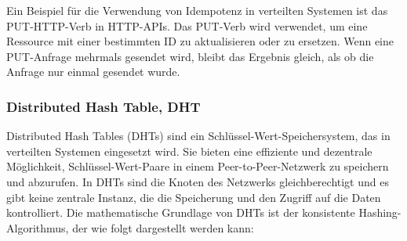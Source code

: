 \documentclass[../vs-script-first-v01.tex]{subfiles}
\begin{document}
Ein Beispiel für die Verwendung von Idempotenz in verteilten Systemen ist das PUT-HTTP-Verb in HTTP-APIs. Das PUT-Verb wird verwendet, um eine Ressource mit einer bestimmten ID zu aktualisieren oder zu ersetzen. Wenn eine PUT-Anfrage mehrmals gesendet wird, bleibt das Ergebnis gleich, als ob die Anfrage nur einmal gesendet wurde. 


\subsubsection{Distributed Hash Table, DHT}

Distributed Hash Tables (DHTs) sind ein Schlüssel-Wert-Speichersystem, das in verteilten Systemen eingesetzt wird. Sie bieten eine effiziente und dezentrale Möglichkeit, Schlüssel-Wert-Paare in einem Peer-to-Peer-Netzwerk zu speichern und abzurufen. In DHTs sind die Knoten des Netzwerks gleichberechtigt und es gibt keine zentrale Instanz, die die Speicherung und den Zugriff auf die Daten kontrolliert.
Die mathematische Grundlage von DHTs ist der konsistente Hashing-Algorithmus, der wie folgt dargestellt werden kann:
\end{document}

